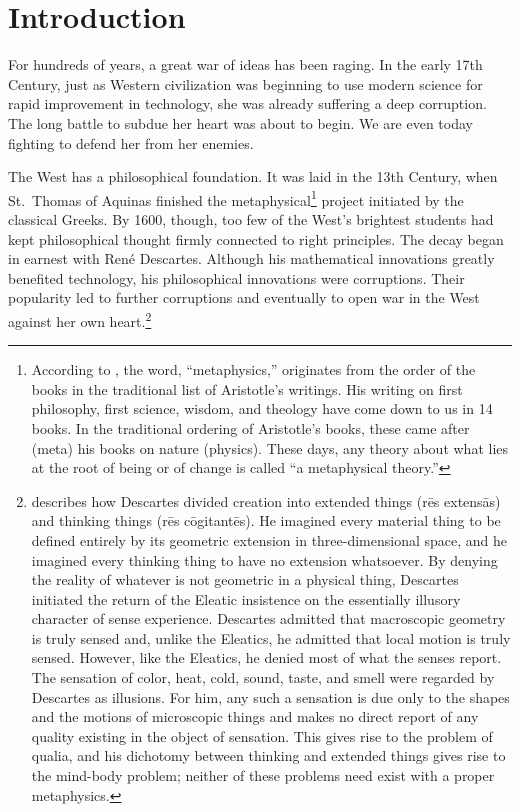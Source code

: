 \documentclass[twocolumn]{article}
\begin{document}
\thispagestyle{fancy}

\section{Introduction}

For hundreds of years, a great war of ideas has been raging.  In the early 17th
Century, just as Western civilization was beginning to use modern science for
rapid improvement in technology, she was already suffering a deep corruption.
The long battle to subdue her heart was about to begin.  We are even today
fighting to defend her from her enemies.

The West has a philosophical foundation.  It was laid in the 13th Century, when
St.~Thomas of Aquinas finished the metaphysical\footnote{%
   According to \cite{vis2017}, the word, ``metaphysics,'' originates from the
   order of the books in the traditional list of Aristotle's writings.  His
   writing on first philosophy, first science, wisdom, and theology have come
   down to us in 14 books.  In the traditional ordering of Aristotle's books,
   these came after (meta) his books on nature (physics).  These days, any
   theory about what lies at the root of being or of change is called ``a
   metaphysical theory.''%
}
project initiated by the classical Greeks.  By 1600, though, too few of the
West's brightest students had kept philosophical thought firmly connected to
right principles.  The decay began in earnest with Ren\'e Descartes.  Although
his mathematical innovations greatly benefited technology, his philosophical
innovations were corruptions.  Their popularity led to further corruptions and
eventually to open war in the West against her own heart.\footnote{%
   \citet[Chapter IV]{b1954} describes how Descartes divided creation into
   extended things (r\={e}s extens\={a}s) and thinking things (r\={e}s
   c\={o}gitant\={e}s). He imagined every material thing to be defined entirely
   by its geometric extension in three-dimensional space, and he imagined every
   thinking thing to have no extension whatsoever.  By denying the reality of
   whatever is not geometric in a physical thing, Descartes initiated the
   return of the Eleatic insistence on the essentially illusory character of
   sense experience.  Descartes admitted that macroscopic geometry is truly
   sensed and, unlike the Eleatics, he admitted that local motion is truly
   sensed.  However, like the Eleatics, he denied most of what the senses
   report. The sensation of color, heat, cold, sound, taste, and smell were
   regarded by Descartes as illusions.  For him, any such a sensation is due
   only to the shapes and the motions of microscopic things and makes no direct
   report of any quality existing in the object of sensation.  This gives rise
   to the problem of qualia, and his dichotomy between thinking and extended
   things gives rise to the mind-body problem; neither of these problems need
   exist with a proper metaphysics.
}
\end{document}
